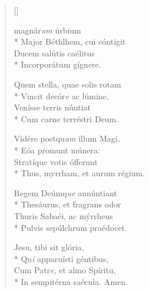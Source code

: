 \newHymn


\begin{verse}[\versewidth]

 magnár\emph{um} úrbium\\*
Major Béthlhem, cui cóntigit\\
Ducem salútis caélitus\\*
Incorporátum gígnere.

\pointtrans

Quem stella, quae solis rotam\\*
Vincit decór\emph{e} ac lúmine,\\
Venísse terris núntiat\\*
Cum carne terréstri Deum.

Vidére postqu\emph{am} illum Magi,\\*
Eóa promunt múnera:\\
Stratíque votis ófferunt\\*
Thus, myrrham, et aurum régium.

Regem Deúmq\emph{ue} annúntiant\\*
Thesáurus, et fragrans odor\\
Thuris Sabaéi, ac m\'yrrheus\\*
Pulvis sepúlchrum praédocet.

Jesu, tibi sit glória,\\*
Qu\emph{i} apparuísti géntibus,\\
Cum Patr\emph{e}, et almo Spíritu,\\*
In sempitérna saécula. Amen.


\end{verse}




